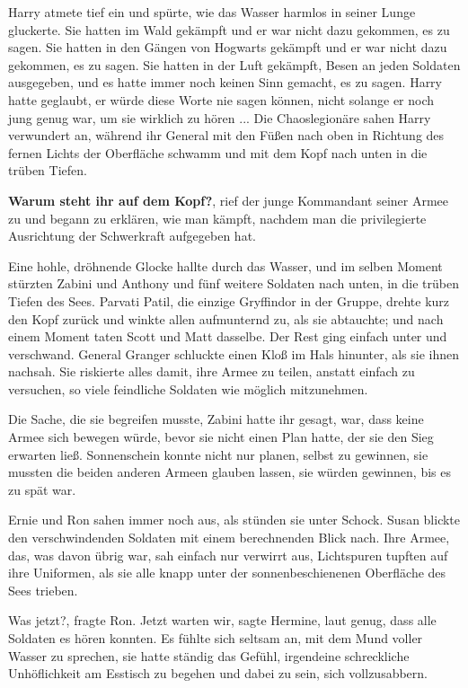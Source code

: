 Harry atmete tief ein und spürte, wie das Wasser harmlos in seiner Lunge
gluckerte. Sie hatten im Wald gekämpft und er war nicht dazu gekommen, es zu
sagen. Sie hatten in den Gängen von Hogwarts gekämpft und er war nicht dazu
gekommen, es zu sagen. Sie hatten in der Luft gekämpft, Besen an jeden Soldaten
ausgegeben, und es hatte immer noch keinen Sinn gemacht, es zu sagen. Harry
hatte geglaubt, er würde diese Worte nie sagen können, nicht solange er noch
jung genug war, um sie wirklich zu hören ... Die Chaoslegionäre sahen Harry
verwundert an, während ihr General mit den Füßen nach oben in Richtung des
fernen Lichts der Oberfläche schwamm und mit dem Kopf nach unten in die trüben
Tiefen.

\glqq{}\textbf{Warum steht ihr auf dem Kopf?}\grqq{}, rief der junge Kommandant
seiner Armee zu und begann zu erklären, wie man kämpft, nachdem man die
privilegierte Ausrichtung der Schwerkraft aufgegeben hat.

Eine hohle, dröhnende Glocke hallte durch das Wasser, und im selben Moment
stürzten Zabini und Anthony und fünf weitere Soldaten nach unten, in die trüben
Tiefen des Sees. Parvati Patil, die einzige Gryffindor in der Gruppe, drehte
kurz den Kopf zurück und winkte allen aufmunternd zu, als sie abtauchte; und
nach einem Moment taten Scott und Matt dasselbe. Der Rest ging einfach unter und
verschwand. General Granger schluckte einen Kloß im Hals hinunter, als sie ihnen
nachsah. Sie riskierte alles damit, ihre Armee zu teilen, anstatt einfach zu
versuchen, so viele feindliche Soldaten wie möglich mitzunehmen.

Die Sache, die sie begreifen musste, Zabini hatte ihr gesagt, war, dass keine
Armee sich bewegen würde, bevor sie nicht einen Plan hatte, der sie den Sieg
erwarten ließ. Sonnenschein konnte nicht nur planen, selbst zu gewinnen, sie
mussten die beiden anderen Armeen glauben lassen, sie würden gewinnen, bis es zu
spät war.

Ernie und Ron sahen immer noch aus, als stünden sie unter Schock. Susan blickte
den verschwindenden Soldaten mit einem berechnenden Blick nach. Ihre Armee, das,
was davon übrig war, sah einfach nur verwirrt aus, Lichtspuren tupften auf ihre
Uniformen, als sie alle knapp unter der sonnenbeschienenen Oberfläche des Sees
trieben.

\glqq{}Was jetzt?\grqq{}, fragte Ron. \glqq{}Jetzt warten wir\grqq{}, sagte
Hermine, laut genug, dass alle Soldaten es hören konnten. Es fühlte sich seltsam
an, mit dem Mund voller Wasser zu sprechen, sie hatte ständig das Gefühl,
irgendeine schreckliche Unhöflichkeit am Esstisch zu begehen und dabei zu sein,
sich vollzusabbern.

